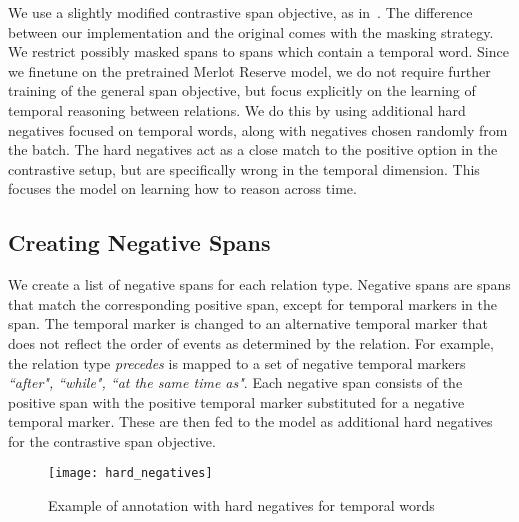 We use a slightly modified contrastive span objective, as
in~\cite{zellers2022mreserve}. The difference between our implementation and
the original comes with the masking strategy. We restrict possibly masked spans
to spans which contain a temporal word. Since we finetune on the pretrained
Merlot Reserve model, we do not require further training of the general span
objective, but focus explicitly on the learning of temporal reasoning between
relations. We do this by using additional hard negatives focused on temporal
words, along with negatives chosen randomly from the batch.  The hard negatives
act as a close match to the positive option in the contrastive setup, but are
specifically wrong in the temporal dimension. This focuses the model on learning
how to reason across time.

\subsection{Creating Negative Spans}

We create a list of negative spans for each relation type. Negative spans are
spans that match the corresponding positive span, except for temporal markers
in the span. The temporal marker is changed to an alternative temporal marker
that does not reflect the order of events as determined by the relation. For
example, the relation type \textit{precedes} is mapped to a set of negative
temporal markers \textit{``after", ``while", ``at the same time as"}. Each
negative span consists of the positive span with the positive temporal marker
substituted for a negative temporal marker. These are then fed to the model
as additional hard negatives for the contrastive span objective.

\begin{figure}[htpb]
	\centering
	\texttt{[image: hard\_negatives]}
	\caption{Example of annotation with hard negatives for temporal words}
	\label{fig:hard_neg}
\end{figure}

